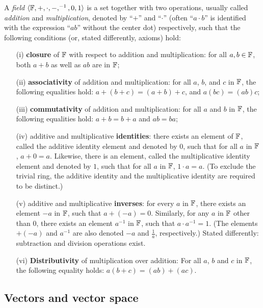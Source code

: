 A {\em field}  $\langle  {\Bbb F} , +, \cdot , -, ^{-1}, 0, 1\rangle$
is a set together with two operations,
usually called {\em addition} and {\em multiplication},   denoted by ``$+$'' and ``$\cdot$''
(often  ``$a\cdot b$'' is identified with the expression ``$ab$'' without the center dot)
respectively, such that the following conditions (or, stated differently, axioms) hold:
\begin{itemize}
\item[(i)]
{\bf closure} of ${\Bbb F}$ with respect to addition and multiplication:
for all $a, b \in {\Bbb F}$, both $a + b$ as well as $a   b$ are in ${\Bbb F}$;
\item[(ii)]
{\bf associativity} of addition and multiplication:
for all $a$, $b$, and $c$ in ${\Bbb F}$,
the following equalities hold: $a + (b + c) = (a + b) + c$,
and
$a (b c) = (a  b) c$;
\item[(iii)]
{\bf commutativity} of addition and multiplication:
for all $a$ and $b$ in ${\Bbb F}$, the following equalities hold: $a + b = b + a$ and $a b = b  a$;
\item[(iv)]
additive and multiplicative {\bf identities}:
there exists an element of ${\Bbb F}$,
called the additive identity element and denoted by $0$, such that for all $a$ in ${\Bbb F}$,
$a + 0 = a$.
Likewise, there is an element, called the multiplicative identity element and denoted by $1$,
such that for all $a$ in ${\Bbb F}$, $1 \cdot a  = a$.
(To exclude the trivial ring, the additive identity and the multiplicative
identity are required to be distinct.)
\item[(v)]
additive and multiplicative {\bf inverses}:
for every $a$ in ${\Bbb F}$, there exists an element $-a$ in ${\Bbb F}$, such that $a + (-a) = 0$.
Similarly, for any $a$ in ${\Bbb F}$ other than $0$, there exists an element $a^{-1}$ in ${\Bbb F}$,
such that $a \cdot a^{-1} = 1$.
(The elements $+ (-a)$ and  $a^{-1}$
are also denoted $-a$ and $\frac{1}{a}$, respectively.)
Stated differently: subtraction and division operations exist.
\item[(vi)]
{\bf Distributivity} of multiplication over addition:
For all $a$, $b$ and $c$ in ${\Bbb F}$, the following equality holds:
$a (b + c) = (a  b) + (a  c)$.
\end{itemize}

\subsection{Vectors and vector space}

